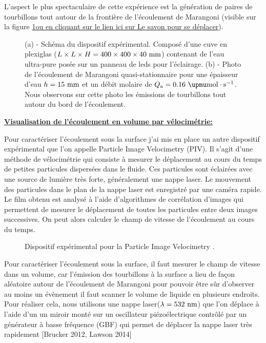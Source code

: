 \documentclass[french, 10pt]{article}
\begin{document}
L'aspect le plus spectaculaire de cette expérience est la génération de paires de tourbillons tout autour de la frontière de l'écoulement de Marangoni (visible sur la figure \ref{fig:Injection1}\href{https://hebergement.universite-paris-saclay.fr/supraconductivite/marangoni/marangoni.html#home}{ou en cliquant sur le lien ici sur \og{}Le savon pour se déplacer\fg{}}). 


\begin{figure}[!ht]
   \centering
   \resizebox{1\textwidth}{!}{}
   \caption{(a) - Schéma du dispositif expérimental. Composé d'une cuve en plexiglas ($L\times L\times H=400\times 400 \times 40 ~\rm mm$) contenant de l'eau ultra-pure posée sur un panneau de leds pour l'éclairage. (b) - Photo de l'écoulement de Marangoni quasi-stationnaire pour une épaisseur d'eau $h=15~\rm mm$ et un débit molaire de $Q_{\rm a} = 0.16~\rm \upmu mol\cdot s^{-1}$. Nous observons sur cette photo les émissions de tourbillons tout autour du bord de l'écoulement.}
  \label{fig:Injection1}
\end{figure}
% 

\noindent\underline{\textbf{Visualisation de l'écoulement en volume par vélocimétrie:}}\medskip
% 

Pour caractériser l'écoulement sous la surface j'ai mis en place un autre dispositif expérimental que l'on appelle Particle Image Velocimetry (PIV). Il s'agit d'une méthode de vélocimétrie qui consiste à mesurer le déplacement au cours du temps de petites particules dispersées dans le fluide. Ces particules sont éclairées avec une source de lumière très forte, généralement une nappe laser. Le mouvement des particules dans le plan de la nappe laser est enregistré par une caméra rapide. Le film obtenu est analysé à l'aide d'algorithmes de corrélation d'images qui permettent de mesurer le déplacement de toutes les particules entre deux images successives. On peut alors calculer le champ de vitesse de l'écoulement au cours du temps.\medskip

\begin{figure}
  \centering
  \resizebox{.5\textwidth}{!}{}
  \caption{Dispositif expérimental pour la \og{} Particle Image Velocimetry \fg{}.}
  \label{fig:DispositfPIV3D}
\end{figure}

Pour caractériser l'écoulement sous la surface, il faut mesurer le champ de vitesse dans un volume, car l'émission des tourbillons à la surface a lieu de façon aléatoire autour de l'écoulement de Marangoni pour pouvoir être sûr d'observer au moins un évènement il faut scanner le volume de liquide en plusieurs endroits. Pour réaliser cela, nous utilisons une nappe laser($\lambda = 532 \rm ~ nm$) que l'on déplace à l'aide d'un un miroir monté sur un oscillateur piézoélectrique contrôlé par un générateur à basse fréquence (GBF) qui permet de déplacer la nappe laser très rapidement [Brucker 2012, Lawson 2014]\medskip%
\end{document}
